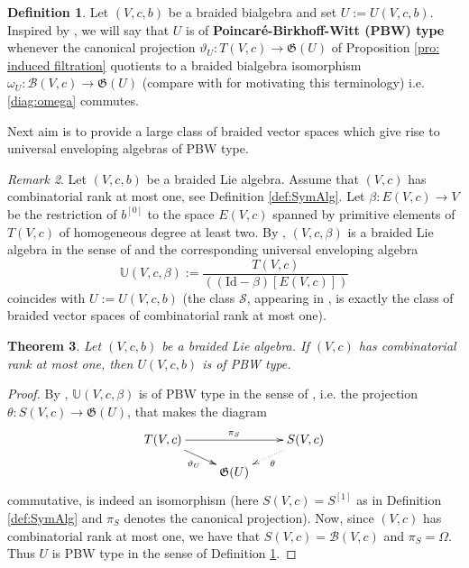 \documentclass[english]{amsart}
\numberwithin{equation}{section}
\numberwithin{figure}{section}
\theoremstyle{plain}
\newtheorem{thm}{Theorem}[section]
\theoremstyle{definition}
\newtheorem{defn}[thm]{Definition}
\theoremstyle{definition}
\theoremstyle{remark}
\theoremstyle{remark}
\newtheorem{rem}[thm]{Remark}
\theoremstyle{plain}
\theoremstyle{plain}
\theoremstyle{plain}
\begin{document}
\begin{defn}
\label{def:PBW type} Let $\left(V,c,b\right)$ be a braided bialgebra
and set $U:=U(V,c,b)$. Inspired by \cite[Definition, page 316]{Braverman-Gaitsgory},
we will say that $U$ is of \textbf{Poincaré-Birkhoff-Witt (PBW) type}
whenever the canonical projection $\vartheta_{U}:T\left(V,c\right)\rightarrow\mathfrak{G}\left(U\right)$
of Proposition \ref{pro: induced filtration} quotients to a braided
bialgebra isomorphism $\omega_{U}:\mathcal{B}\left(V,c\right)\rightarrow\mathfrak{G}\left(U\right)$
(compare with \cite[page 92]{Humphreys} for motivating this terminology)
i.e. \eqref{diag:omega} commutes.
\end{defn}
Next aim is to provide a large class of braided vector spaces which
give rise to universal enveloping algebras of PBW type.
\begin{rem}
\label{rem:Universal}Let $\left(V,c,b\right)$ be a braided Lie algebra.
Assume that $\left(V,c\right)$ has combinatorial rank at most one,
see Definition \ref{def:SymAlg}. Let $\beta:E\left(V,c\right)\rightarrow V$
be the restriction of $b^{[0]}$ to the space $E\left(V,c\right)$ spanned
by primitive elements of $T\left(V,c\right)$ of homogeneous degree
at least two. By \cite[Theorem 5.10]{Ardizzoni-MMPrim}, $\left(V,c,\beta\right)$
is a braided Lie algebra in the sense of \cite[Definition 4.1]{Ardizzoni-Universal}
and the corresponding universal enveloping algebra \[
\mathbb{U}\left(V,c,\beta\right):=\frac{T(V,c)}{\left((\mathrm{Id}-\beta)[E\left(V,c\right)]\right)}\]
coincides with $U:=U\left(V,c,b\right)$ (the class $\mathcal{S}$,
appearing in \cite[Theorem 5.10]{Ardizzoni-MMPrim}, is exactly the
class of braided vector spaces of combinatorial rank at most one). \end{rem}
\begin{thm}
\label{thm:comb1PBW}Let $\left(V,c,b\right)$ be a braided Lie algebra.
If $\left(V,c\right)$ has combinatorial rank at most one, then $U\left(V,c,b\right)$
is of PBW type.\end{thm}
\begin{proof}
By \cite[Theorem 5.4]{Ardizzoni-Universal}, $\mathbb{U}\left(V,c,\beta\right)$
is of PBW type in the sense of \cite[Definition 4.14]{Ardizzoni-Universal},
i.e. the projection $\theta:S(V,c)\rightarrow\mathfrak{G}\left(U\right)$,
that makes the diagram\[
\xymatrix@R=10pt{T(V,c)\ar[rr]^{\pi_{S}}\ar[rd]_{\vartheta_{U}} &  & S(V,c)\ar@{.>}[ld]^{\theta}\\
 & \mathfrak{G}(U)}
\]
commutative, is indeed an isomorphism (here $S(V,c)=S^{[1]}$ as in
Definition \ref{def:SymAlg} and $\pi_{S}$ denotes the canonical
projection). Now, since $\left(V,c\right)$ has combinatorial rank
at most one, we have that $S(V,c)=\mathcal{B}\left(V,c\right)$ and
$\pi_{S}=\Omega$. Thus $U$ is PBW type in the sense of Definition
\ref{def:PBW type}.\end{proof}
\end{document}
